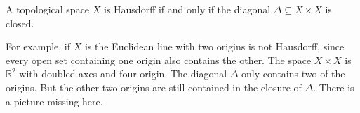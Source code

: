 A topological space $X$ is Hausdorff if and only if the diagonal
$\Delta \subseteq X\times X$ is closed.


For example, if $X$ is
the Euclidean line with two origins is not Hausdorff, since every open set containing
one origin also contains the other.
The space $X\times X$ is $\mathbb{R}^2$ with doubled axes and four origin. The
diagonal $\Delta$ only contains two of the origins. But the other two origins
are still contained in the closure of $\Delta$. There is a picture missing here.
